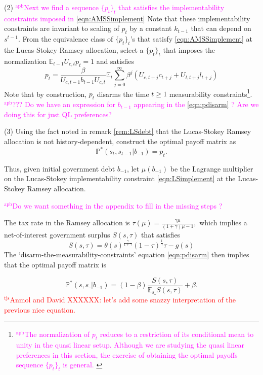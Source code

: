 \documentclass[12pt]{article}
\newcommand{\apb}[1]{\textcolor{magenta}{$^{\textrm{apb}}${#1}}}
\newcommand{\tjs}[1]{\textcolor{red}{$^{\textrm{tjs}}${#1}}}
\newcommand{\EE}{\mathbb E}
\begin{document}
\noindent (2) \apb{Next we find a sequence $\{p_t\}_t$ that satisfies the implementability constraints imposed in \eqref{eqn:AMSSimplement}} Note that these implementability constraints are invariant to scaling of $p_t$ by a constant $k_{t-1} $ that can depend on $s^{t-1}$. From the equivalence class of $\{p_t\}_t$'s that satisfy \eqref{eqn:AMSSimplement} at the Lucas-Stokey Ramsey allocation, select a  $\{p_t\}_t$ that imposes the normalization  $\mathbb{E}_{t-1}U_{c,t}p_t=1$ and satisfies
\begin{equation}\label{eqn:pdisarm} p_t =  \frac{\beta}{U_{c,t-1} b_{t-1} U_{c,t}}\EE_t\sum_{j=0}^\infty\beta^j\left( U_{c,t+j}c_{t+j}+U_{l,t+j}l_{t+j}\right) \end{equation}
Note that by construction, $p_t$   disarms the time  $t\geq 1$
measurability constraints\footnote{\apb{The normalization of $p_t$ reduces to a restriction of its conditional mean to unity in the quasi linear setup. Although we are studying the quasi linear preferences in this section, the exercise of obtaining the optimal payoffs sequence $\{p_t\}_t$ is general. }}. 
\apb{??? Do we have an expression for $b_{t-1}$ appearing in the \eqref{eqn:pdisarm} ? Are we doing this for just QL preferences? }

\noindent  (3) Using the fact noted in remark \ref{rem:LSdebt} that the Lucas-Stokey Ramsey allocation is not history-dependent,  construct the optimal payoff matrix as
\[\mathbb{P}^*(s_t,s_{t-1}|b_{-1})=p_t.\]

Thus,  given
 initial government debt $b_{-1}$,  let $\mu(b_{-1})$ be the Lagrange multiplier on the Lucas-Stokey implementability constraint \eqref{eqn:LSimplement}
 at the Lucas-Stokey Ramsey allocation.  
 
 \apb{Do we want something in the appendix to fill in the missing steps ?}
 
 The tax rate in the Ramsey allocation is
$
		\tau(\mu) = \frac{\gamma\mu}{(1+\gamma)\mu-1},
	$
 which implies a  net-of-interest government surplus $S(s,\tau)$ that satisfies
\[		S(s,\tau) = \theta(s)^\frac\gamma{1+\gamma}(1-\tau)^\frac1\gamma\tau-g(s)
	\]
The `disarm-the-measurability-constraints' equation \eqref{eqn:pdisarm} then implies that the optimal payoff matrix is

\begin{equation}\label{eqn:optPP}
 \mathbb{P}^*(s, s\_ |b_{-1}) = (1-\beta)\frac{S(s,\tau)}{\EE_{s\_} S(s,\tau)} + \beta.
 \end{equation}
\tjs{Anmol and David XXXXXX: let's add some snazzy interpretation of the previous nice equation.}
\end{document}

